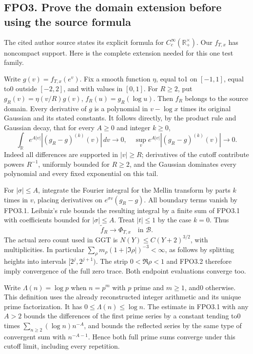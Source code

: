 \subsection{FPO3. Prove the domain extension before using the source
formula}\label{fpo3.-prove-the-domain-extension-before-using-the-source-formula}

The cited author source states its explicit formula for
\(C_c^\infty(\mathbb R_+^\times)\). Our \(f_{T,x}\) has noncompact
support. Here is the complete extension needed for this one test family.

Write \(g(v)=f_{T,x}(e^v)\). Fix a smooth function \(\eta\), equal to1
on \([-1,1]\), equal to0 outside \([-2,2]\), and with values in
\([0,1]\). For \(R\ge2\), put \(g_R(v)=\eta(v/R)g(v)\),
\(f_R(u)=g_R(\log u)\). Then \(f_R\) belongs to the source domain. Every
derivative of \(g\) is a polynomial in \(v-\log x\) times its original
Gaussian and its stated constants. It follows directly, by the product
rule and Gaussian decay, that for every \(A\ge0\) and integer \(k\ge0\),
\[
\int_{\mathbb R}e^{A|v|}|(g_R-g)^{(k)}(v)|\,dv\longrightarrow0,
\quad
\sup_v e^{A|v|}|(g_R-g)^{(k)}(v)|\longrightarrow0.
\tag{FPO3.1}
\] Indeed all differences are supported in \(|v|\ge R\); derivatives of
the cutoff contribute powers \(R^{-1}\), uniformly bounded for
\(R\ge2\), and the Gaussian dominates every polynomial and every fixed
exponential on this tail.

For \(|\sigma|\le A\), integrate the Fourier integral for the Mellin
transform by parts \(k\) times in \(v\), placing derivatives on
\(e^{\sigma v}(g_R-g)\). All boundary terms vanish by FPO3.1. Leibniz's
rule bounds the resulting integral by a finite sum of FPO3.1 with
coefficients bounded for \(|\sigma|\le A\). Treat \(|t|\le1\) by the
case \(k=0\). Thus \[
\widetilde f_R\longrightarrow\Phi_{T,x}\quad\text{in }\mathcal B.
\tag{FPO3.2}
\] The actual zero count used in GGT is \(N(Y)\le C(Y+2)^{3/2}\), with
multiplicities. In particular
\(\sum_\rho m_\rho(1+|\Im\rho|)^{-3}<\infty\), as follows by splitting
heights into intervals \([2^j,2^{j+1})\). The strip \(0<\Re\rho<1\) and
FPO3.2 therefore imply convergence of the full zero trace. Both endpoint
evaluations converge too.

Write \(\Lambda(n)=\log p\) when \(n=p^m\) with \(p\) prime and
\(m\ge1\), and0 otherwise. This definition uses the already
reconstructed integer arithmetic and its unique prime factorization. It
has \(0\le\Lambda(n)\le\log n\). The estimate in FPO3.1 with any \(A>2\)
bounds the differences of the first prime series by a constant tending
to0 times \(\sum_{n\ge2}(\log n)n^{-A}\), and bounds the reflected
series by the same type of convergent sum with \(n^{-A-1}\). Hence both
full prime sums converge under this cutoff limit, including every
repetition.

